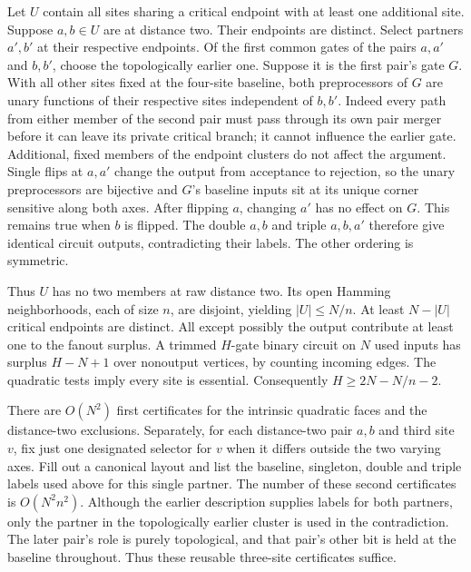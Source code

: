 \documentclass[11pt]{article}
\begin{document}
Let \(U\) contain all sites sharing a critical endpoint with at least one additional site. Suppose \(a,b\in U\) are at distance two. Their endpoints are distinct. Select partners \(a',b'\) at their respective endpoints. Of the first common gates of the pairs \(a,a'\) and \(b,b'\), choose the topologically earlier one. Suppose it is the first pair's gate \(G\). With all other sites fixed at the four-site baseline, both preprocessors of \(G\) are unary functions of their respective sites independent of \(b,b'\). Indeed every path from either member of the second pair must pass through its own pair merger before it can leave its private critical branch; it cannot influence the earlier gate. Additional, fixed members of the endpoint clusters do not affect the argument. Single flips at \(a,a'\) change the output from acceptance to rejection, so the unary preprocessors are bijective and \(G\)'s baseline inputs sit at its unique corner sensitive along both axes. After flipping \(a\), changing \(a'\) has no effect on \(G\). This remains true when \(b\) is flipped. The double \(a,b\) and triple \(a,b,a'\) therefore give identical circuit outputs, contradicting their labels. The other ordering is symmetric.

Thus \(U\) has no two members at raw distance two. Its open Hamming neighborhoods, each of size \(n\), are disjoint, yielding \(|U|\le N/n\). At least \(N-|U|\) critical endpoints are distinct. All except possibly the output contribute at least one to the fanout surplus. A trimmed \(H\)-gate binary circuit on \(N\) used inputs has surplus \(H-N+1\) over nonoutput vertices, by counting incoming edges. The quadratic tests imply every site is essential. Consequently \(H\ge2N-N/n-2\).

There are \(O(N^2)\) first certificates for the intrinsic quadratic faces and the distance-two exclusions. Separately, for each distance-two pair \(a,b\) and third site \(v\), fix just one designated selector for \(v\) when it differs outside the two varying axes. Fill out a canonical layout and list the baseline, singleton, double and triple labels used above for this single partner. The number of these second certificates is \(O(N^2n^2)\). Although the earlier description supplies labels for both partners, only the partner in the topologically earlier cluster is used in the contradiction. The later pair's role is purely topological, and that pair's other bit is held at the baseline throughout. Thus these reusable three-site certificates suffice.
\end{document}
